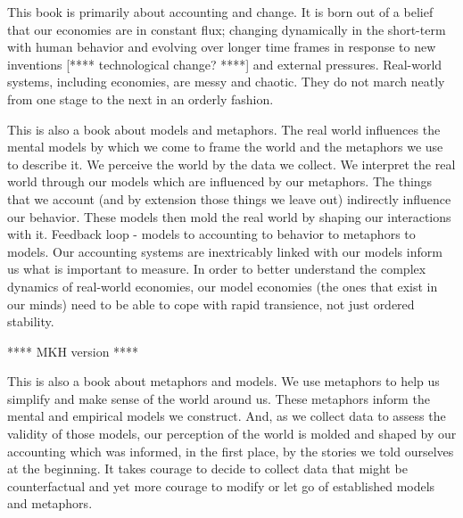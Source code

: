 
This book is primarily about accounting and change. 
It is born out of a belief that our economies are in constant flux;
changing dynamically in the short-term with human behavior 
and evolving over longer time frames in response to new inventions 
[**** technological change? ****] and
external pressures.
Real-world systems, including economies, are messy and chaotic.
They do not march neatly from one stage to the next 
in an orderly fashion.

This is also a book about models and metaphors.
The real world influences the mental models 
by which we come to frame the world and 
the metaphors we use to describe it.
We perceive the world by the data we collect.
We interpret the real world through our models
which are influenced by our metaphors.
The things that we account 
(and by extension those things we leave out)
indirectly influence our behavior.
These models then mold the real world by shaping our
interactions with it.
Feedback loop - models to accounting to behavior to metaphors to models.
Our accounting systems are inextricably linked 
with our models inform us what is important to measure.
In order to better understand the complex dynamics 
of real-world economies, 
our model economies
(the ones that exist in our minds)
need to be able to cope with rapid transience,
not just ordered stability.



**** MKH version ****

This is also a book about metaphors and models.
We use metaphors to help us simplify and make sense of the world around us.
These metaphors inform the mental and empirical models we construct.
And, as we collect data to assess the validity of those models, 
our perception of the world is molded and shaped
by our accounting which was informed, in the first place, 
by the stories we told ourselves at the beginning.
It takes courage to decide to collect data that might be counterfactual
and yet more courage to modify or let go of established models and metaphors.


